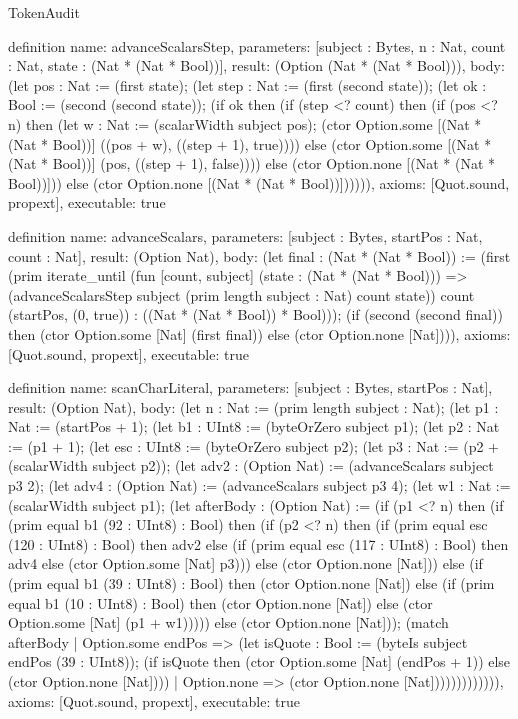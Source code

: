 \begin{lexlean}{TokenAudit}
\begin{semanticmodule}
definition{
  name: advanceScalarsStep,
  parameters: [subject : Bytes, n : Nat, count : Nat, state : (Nat * (Nat * Bool))],
  result: (Option (Nat * (Nat * Bool))),
  body: (let pos : Nat := (first state); (let step : Nat := (first (second state)); (let ok : Bool := (second (second state)); (if ok then (if (step <? count) then (if (pos <? n) then (let w : Nat := (scalarWidth subject pos); (ctor Option.some [(Nat * (Nat * Bool))] ((pos + w), ((step + 1), true)))) else (ctor Option.some [(Nat * (Nat * Bool))] (pos, ((step + 1), false)))) else (ctor Option.none [(Nat * (Nat * Bool))])) else (ctor Option.none [(Nat * (Nat * Bool))]))))),
  axioms: [Quot.sound, propext],
  executable: true
}

definition{
  name: advanceScalars,
  parameters: [subject : Bytes, startPos : Nat, count : Nat],
  result: (Option Nat),
  body: (let final : (Nat * (Nat * Bool)) := (first (prim iterate_until (fun [count, subject] (state : (Nat * (Nat * Bool))) => (advanceScalarsStep subject (prim length subject : Nat) count state)) count (startPos, (0, true)) : ((Nat * (Nat * Bool)) * Bool))); (if (second (second final)) then (ctor Option.some [Nat] (first final)) else (ctor Option.none [Nat]))),
  axioms: [Quot.sound, propext],
  executable: true
}

definition{
  name: scanCharLiteral,
  parameters: [subject : Bytes, startPos : Nat],
  result: (Option Nat),
  body: (let n : Nat := (prim length subject : Nat); (let p1 : Nat := (startPos + 1); (let b1 : UInt8 := (byteOrZero subject p1); (let p2 : Nat := (p1 + 1); (let esc : UInt8 := (byteOrZero subject p2); (let p3 : Nat := (p2 + (scalarWidth subject p2)); (let adv2 : (Option Nat) := (advanceScalars subject p3 2); (let adv4 : (Option Nat) := (advanceScalars subject p3 4); (let w1 : Nat := (scalarWidth subject p1); (let afterBody : (Option Nat) := (if (p1 <? n) then (if (prim equal b1 (92 : UInt8) : Bool) then (if (p2 <? n) then (if (prim equal esc (120 : UInt8) : Bool) then adv2 else (if (prim equal esc (117 : UInt8) : Bool) then adv4 else (ctor Option.some [Nat] p3))) else (ctor Option.none [Nat])) else (if (prim equal b1 (39 : UInt8) : Bool) then (ctor Option.none [Nat]) else (if (prim equal b1 (10 : UInt8) : Bool) then (ctor Option.none [Nat]) else (ctor Option.some [Nat] (p1 + w1))))) else (ctor Option.none [Nat])); (match afterBody
    | Option.some endPos => (let isQuote : Bool := (byteIs subject endPos (39 : UInt8)); (if isQuote then (ctor Option.some [Nat] (endPos + 1)) else (ctor Option.none [Nat])))
    | Option.none => (ctor Option.none [Nat])))))))))))),
  axioms: [Quot.sound, propext],
  executable: true
}


\end{semanticmodule}
\end{lexlean}
